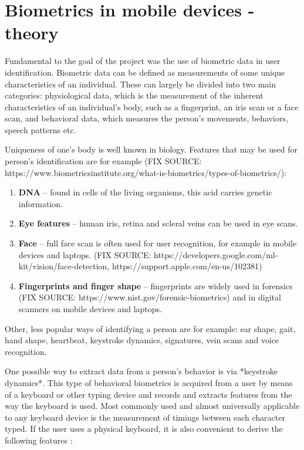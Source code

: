 
\chapter{Biometrics in mobile devices - theory}

Fundamental to the goal of the project was the use of biometric data in user identification. Biometric data can be defined as measurements of some unique characteristics of an individual. These can largely be divided into two main categories: physiological data, which is the measurement of the inherent characteristics of an individual's body, such as a fingerprint, an iris scan or a face scan, and behavioral data, which measures the person's movements, behaviors, speech patterns etc. \cite{Abde2023}

Uniqueness of one's body is well known in biology. Features that may be used for person's identification are for example (FIX SOURCE: https://www.biometricsinstitute.org/what-is-biometrics/types-of-biometrics/):

\begin{enumerate}
    \item \textbf{DNA} -- found in cells of the living organisms, this acid carries genetic information.
    \item \textbf{Eye features} -- human iris, retina and scleral veins can be used in eye scans.
    \item \textbf{Face} -- full face scan is often used for user recognition, for example in mobile devices and laptops. (FIX SOURCE: https://developers.google.com/ml-kit/vision/face-detection, https://support.apple.com/en-us/102381)
    \item \textbf{Fingerprints and finger shape} -- fingerprints are widely used in forensics (FIX SOURCE: https://www.nist.gov/forensic-biometrics) and in digital scanners on mobile devices and laptops.
\end{enumerate}

Other, less popular ways of identifying a person are for example: ear shape, gait, hand shape, heartbeat, keystroke dynamics, signatures, vein scans and voice recognition.

One possible way to extract data from a person's behavior is via *keystroke dynamics*. This type of behavioral biometrics is acquired from a user by means of a keyboard or other typing device and records and extracts features from the way the keyboard is used. Most commonly used and almost universally applicable to any keyboard device is the measurement of timings between each character typed. If the user uses a physical keyboard, it is also convenient to derive the following features \cite{Shar2023}:

